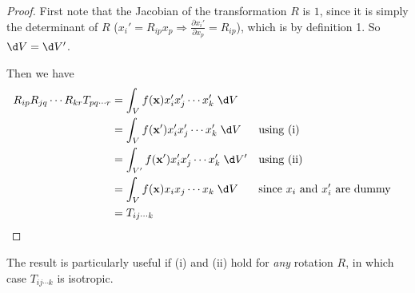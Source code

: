 \documentclass[a4paper]{article}
\begin{document}
\begin{proof}
  First note that the Jacobian of the transformation $R$ is $1$, since it is simply the determinant of $R$ ($x_i' = R_{ip}x_p \Rightarrow \frac{\partial x_i'}{\partial x_p} = R_{ip}$), which is by definition 1. So $\d V = \d V'$.

  Then we have
  \begin{align*}
    R_{ip}R_{jq}\cdots R_{kr} T_{pq\cdots r} &= \int_V f(\mathbf{x})x_i' x_j' \cdots x_k' \;\d V\\
    &= \int_V f(\mathbf{x}')x_i' x_j' \cdots x_k'\;\d V&&\text{using (i)}\\
    &= \int_{V'} f(\mathbf{x}') x_i' x_j' \cdots x_k' \;\d V'&&\text{using (ii)}\\
    &= \int_{V} f(\mathbf{x}) x_i x_j \cdots x_k \;\d V&&\text{since $x_i$ and $x_i'$ are dummy}\\
    &= T_{ij\cdots k}
  \end{align*}
\end{proof}

The result is particularly useful if (i) and (ii) hold for \emph{any} rotation $R$, in which case $T_{ij\cdots k}$ is isotropic.
\end{document}
